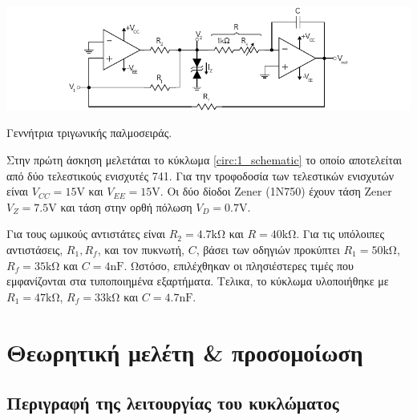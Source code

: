 \begin{center}
	\begin{circuitfig}[H]
		\includegraphics[width=\textwidth]{circuits/micro3_lab1.pdf}
		\caption{Γεννήτρια τριγωνικής παλμοσειράς.}
		\label{circ:1_schematic}
	\end{circuitfig}
\end{center}
\vspace*{-1cm}

Στην πρώτη άσκηση μελετάται το κύκλωμα \ref{circ:1_schematic} το οποίο αποτελείται από δύο τελεστικούς ενισχυτές 741. Για την τροφοδοσία των τελεστικών ενισχυτών είναι $V_{CC}=15\unit{\volt}$ και $V_{EE}=15\unit{\volt}$. Οι δύο δίοδοι Zener (1N750) έχουν τάση Zener $V_Z=7.5\unit{\volt}$ και τάση στην ορθή πόλωση $V_D=0.7\unit{\volt}$.\par
Για τους ωμικούς αντιστάτες είναι $R_2=4.7\unit{\kilo\ohm}$ και $R=40\unit{\kilo\ohm}$. Για τις υπόλοιπες αντιστάσεις, $R_1,R_f$, και τον πυκνωτή, $C$, βάσει των οδηγιών προκύπτει $R_1=50\unit{\kilo\ohm}$, $R_f=35\unit{\kilo\ohm}$ και $C=4\unit{\nano\farad}$. Ωστόσο, επιλέχθηκαν οι πλησιέστερες τιμές που εμφανίζονται στα τυποποιημένα εξαρτήματα. Τελικα, το κύκλωμα υλοποιήθηκε με $R_1=47\unit{\kilo\ohm}$, $R_f=33\unit{\kilo\ohm}$ και $C=4.7\unit{\nano\farad}$.\par

\section{Θεωρητική μελέτη \& προσομοίωση}

	\subsection{Περιγραφή της λειτουργίας του κυκλώματος}
		



